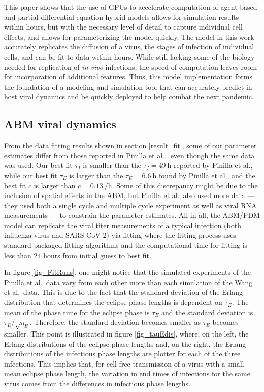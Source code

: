 This paper shows that the use of GPUs to accelerate computation of agent-based and partial-differential equation hybrid models allows for simulation results within hours, but with the necessary level of detail to capture individual cell effects, and allows for parameterizing the model quickly. The model in this work accurately replicates the diffusion of a virus, the stages of infection of individual cells, and can be fit to data within hours. While still lacking some of the biology needed for replication of \emph{in vivo} infections, the speed of computation leaves room for incorporation of additional features. Thus, this model implementation forms the foundation of a modeling and simulation tool that can accurately predict in-host viral dynamics and be quickly deployed to help combat the next pandemic. 

\subsection{ABM viral dynamics}

From the data fitting results shown in section \ref{result_fit}, some of our parameter estimates differ from those reported in Pinilla et al.\ \citep{pinilla12} even though the same data was used. Our best fit $\tau_I$ is smaller than the $\tau_I = \SI{49}{\hour}$ reported by Pinilla et al., while our best fit $\tau_E$ is larger than the $\tau_E = \SI{6.6}{\hour}$ found by Pinilla et al., and the best fit $c$ is larger than $c = \SI{0.13}{\per\hour}$. Some of this discrepancy might be due to the inclusion of spatial effects in the ABM, but Pinilla et al.\ also used more data --- they used both a single cycle and multiple cycle experiment as well as viral RNA measurements --- to constrain the parameter estimates. All in all, the ABM/PDM model can replicate the viral titer measurements of a typical infection (both influenza virus and SARS-CoV-2) via fitting where the fitting process uses standard packaged fitting algorithms and the computational time for fitting is less than 24 hours from initial guess to best fit.

In figure \ref{fig_FitRuns}, one might notice that the simulated experiments of the Pinilla et al.\ data vary from each other more than each simulation of the Wang et al.\ data. This is due to the fact that the standard deviation of the Erlang distribution that determines the eclipse phase lengths is dependent on $\tau_E$. The mean of the phase time for the eclipse phase is $\tau_E$ and the standard deviation is $\tau_E/\sqrt{\eta_E}$. Therefore, the standard deviation becomes smaller as $\tau_E$ becomes smaller. This point is illustrated in figure \ref{fig_tauEdis}, where, on the left, the Erlang distributions of the eclipse phase lengths and, on the right, the Erlang distributions of the infectious phase lengths are plotter for each of the three infections. This implies that, for cell free transmission of a virus with a small mean eclipse phase length, the variation in end times of infections for the same virus comes from the differences in infectious phase lengths.

